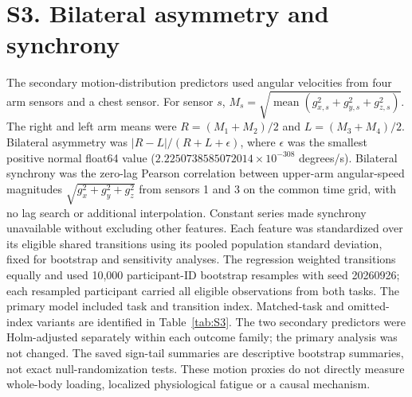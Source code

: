 \documentclass[10pt]{article}
\begin{document}
\section*{S3. Bilateral asymmetry and synchrony}
The secondary motion-distribution predictors used angular velocities from four arm sensors and a chest sensor. For sensor $s$, $M_s=\sqrt{\operatorname{mean}(g_{x,s}^2+g_{y,s}^2+g_{z,s}^2)}$. The right and left arm means were $R=(M_1+M_2)/2$ and $L=(M_3+M_4)/2$. Bilateral asymmetry was $|R-L|/(R+L+\epsilon)$, where $\epsilon$ was the smallest positive normal float64 value ($2.2250738585072014\times10^{-308}$ degrees/s). Bilateral synchrony was the zero-lag Pearson correlation between upper-arm angular-speed magnitudes $\sqrt{g_x^2+g_y^2+g_z^2}$ from sensors 1 and 3 on the common time grid, with no lag search or additional interpolation. Constant series made synchrony unavailable without excluding other features.
Each feature was standardized over its eligible shared transitions using its pooled population standard deviation, fixed for bootstrap and sensitivity analyses. The regression weighted transitions equally and used 10,000 participant-ID bootstrap resamples with seed 20260926; each resampled participant carried all eligible observations from both tasks. The primary model included task and transition index. Matched-task and omitted-index variants are identified in Table~\ref{tab:S3}. The two secondary predictors were Holm-adjusted separately within each outcome family; the primary analysis was not changed. The saved sign-tail summaries are descriptive bootstrap summaries, not exact null-randomization tests. These motion proxies do not directly measure whole-body loading, localized physiological fatigue or a causal mechanism.
\end{document}
